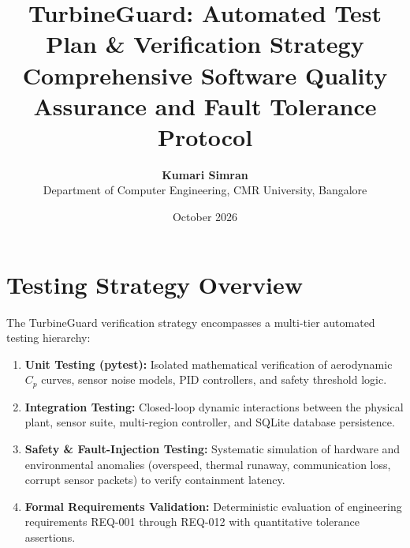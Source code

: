 \documentclass[11pt,a4paper]{article}
\title{\textbf{TurbineGuard: Automated Test Plan \& Verification Strategy}\\
\large Comprehensive Software Quality Assurance and Fault Tolerance Protocol}
\author{\textbf{Kumari Simran}\\
Department of Computer Engineering, CMR University, Bangalore}
\date{October 2026}
\begin{document}
\maketitle

\section{Testing Strategy Overview}
The TurbineGuard verification strategy encompasses a multi-tier automated testing hierarchy:
\begin{enumerate}
    \item \textbf{Unit Testing (pytest):} Isolated mathematical verification of aerodynamic $C_p$ curves, sensor noise models, PID controllers, and safety threshold logic.
    \item \textbf{Integration Testing:} Closed-loop dynamic interactions between the physical plant, sensor suite, multi-region controller, and SQLite database persistence.
    \item \textbf{Safety \& Fault-Injection Testing:} Systematic simulation of hardware and environmental anomalies (overspeed, thermal runaway, communication loss, corrupt sensor packets) to verify containment latency.
    \item \textbf{Formal Requirements Validation:} Deterministic evaluation of engineering requirements REQ-001 through REQ-012 with quantitative tolerance assertions.
\end{enumerate}
\end{document}
